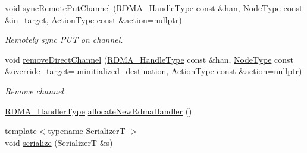\begin{DoxyCompactItemize}
void \hyperlink{structvt_1_1rdma_1_1_r_d_m_a_manager_aae382995709cd7827f256f9d5f3e45e4}{sync\+Remote\+Put\+Channel} (\hyperlink{namespacevt_a10442579ec4e7ebef223818e64bcf908}{R\+D\+M\+A\+\_\+\+Handle\+Type} const \&han, \hyperlink{namespacevt_a866da9d0efc19c0a1ce79e9e492f47e2}{Node\+Type} const \&in\+\_\+target, \hyperlink{namespacevt_ae0a5a7b18cc99d7b732cb4d44f46b0f3}{Action\+Type} const \&action=nullptr)
\begin{DoxyCompactList}\small\item\em Remotely sync P\+UT on channel. \end{DoxyCompactList}\item 
void \hyperlink{structvt_1_1rdma_1_1_r_d_m_a_manager_a9767f9beafd9a352ae2b9f0a189f7346}{remove\+Direct\+Channel} (\hyperlink{namespacevt_a10442579ec4e7ebef223818e64bcf908}{R\+D\+M\+A\+\_\+\+Handle\+Type} const \&han, \hyperlink{namespacevt_a866da9d0efc19c0a1ce79e9e492f47e2}{Node\+Type} const \&override\+\_\+target=uninitialized\+\_\+destination, \hyperlink{namespacevt_ae0a5a7b18cc99d7b732cb4d44f46b0f3}{Action\+Type} const \&action=nullptr)
\begin{DoxyCompactList}\small\item\em Remove channel. \end{DoxyCompactList}\item 
\hyperlink{namespacevt_a9530efb893c0f3846e8ac5f0507e0f49}{R\+D\+M\+A\+\_\+\+Handler\+Type} \hyperlink{structvt_1_1rdma_1_1_r_d_m_a_manager_a9b393c6dbd360c0b7bfb899e3fc0451b}{allocate\+New\+Rdma\+Handler} ()
\item 
{\footnotesize template$<$typename SerializerT $>$ }\\void \hyperlink{structvt_1_1rdma_1_1_r_d_m_a_manager_a3836ae3598530ab0c5486695f4fcf180}{serialize} (SerializerT \&s)
\end{DoxyCompactItemize}

